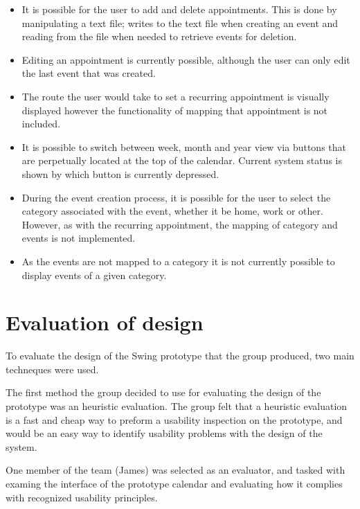 \documentclass{article}
\begin{document}
\begin{itemize}
       
\item It is possible for the user to add and delete appointments. This is
done by manipulating a text file; writes to the text file when creating an
event and reading from the file when needed to retrieve events for deletion.
\item Editing an appointment is currently possible, although the user can
only edit the last event that was created.
\item The route the user would take to set a recurring appointment is
visually displayed however the functionality of mapping that appointment
is not included.
\item It is possible to switch between week, month and year view
via buttons that are perpetually located at the top of the calendar. Current
system status is shown by which button is currently depressed.
\item  During the event creation process, it is possible for the user to
select the category associated with the event, whether it be home, work or
other. However, as with the recurring appointment, the mapping of category
and events is not implemented.
\item As the events are not mapped to a category it is not currently
possible to display events of a given category.

\end{itemize}


\section{Evaluation of design}

To evaluate the design of the Swing prototype that the group produced, two main techneques were used.  

The first method the group decided to use for evaluating the design of the prototype was an heuristic evaluation. 
The group felt that a heuristic evaluation is a fast and cheap way to preform a usability inspection on the prototype, and would be an easy way to identify usability problems with the design of the system. 

One member of the team (James) was selected as an evaluator, and tasked with examing the interface of the prototype calendar and evaluating how it complies with recognized usability principles. 
\end{document}
